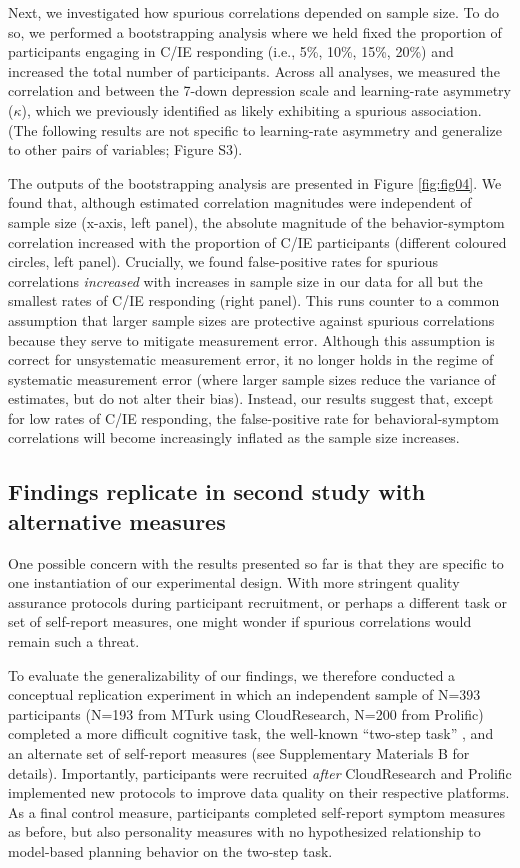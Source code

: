 \documentclass[a4paper,notitlepage,12pt]{article}
\begin{document}
Next, we investigated how spurious correlations depended on sample size. To do so, we performed a bootstrapping analysis where we held fixed the proportion of participants engaging in C/IE responding (i.e., 5\%, 10\%, 15\%, 20\%) and increased the total number of participants. Across all analyses, we measured the correlation and between the 7-down depression scale and learning-rate asymmetry ($\kappa$), which we previously identified as likely exhibiting a spurious association. (The following results are not specific to learning-rate asymmetry and generalize to other pairs of variables; Figure S3).  

The outputs of the bootstrapping analysis are presented in Figure \ref{fig:fig04}. We found that, although estimated correlation magnitudes were independent of sample size (x-axis, left panel), the absolute magnitude of the behavior-symptom correlation increased with the proportion of C/IE participants (different coloured circles, left panel). Crucially, we found false-positive rates for spurious correlations \emph{increased} with increases in sample size in our data for all but the smallest rates of C/IE responding (right panel). This runs counter to a common assumption that larger sample sizes are protective against spurious correlations because they serve to mitigate measurement error. Although this assumption is correct for unsystematic measurement error, it no longer holds in the regime of systematic measurement error (where larger sample sizes reduce the variance of estimates, but do not alter their bias). Instead, our results suggest that, except for low rates of C/IE responding, the false-positive rate for behavioral-symptom correlations will become increasingly inflated as the sample size increases.

\subsection*{Findings replicate in second study with alternative measures}

One possible concern with the results presented so far is that they are specific to one instantiation of our experimental design. With more stringent quality assurance protocols during participant recruitment, or perhaps a different task or set of self-report measures, one might wonder if spurious correlations would remain such a threat.

To evaluate the generalizability of our findings, we therefore conducted a conceptual replication experiment in which an independent sample of N=393 participants (N=193 from MTurk using CloudResearch, N=200 from Prolific) completed a more difficult cognitive task, the well-known ``two-step task'' \cite{daw2011model}, and an alternate set of self-report measures (see Supplementary Materials B for details). Importantly, participants were recruited \textit{after} CloudResearch and Prolific implemented new protocols to improve data quality on their respective platforms. As a final control measure, participants completed self-report symptom measures as before, but also personality measures with no hypothesized relationship to model-based planning behavior on the two-step task. 
\end{document}
